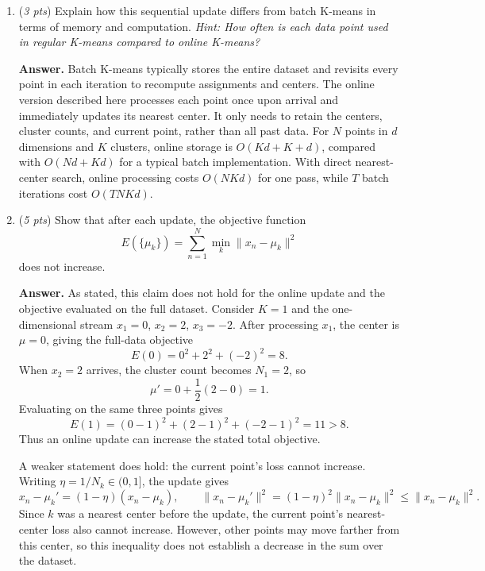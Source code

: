 \documentclass[11pt]{article}
\begin{document}
\begin{enumerate}[label=(\alph*)]
    \item (\textit{3 pts}) Explain how this sequential update differs from batch K-means in terms of memory and computation. \textit{Hint: How often is each data point used in regular K-means compared to online K-means?}

    \textbf{Answer.} Batch K-means typically stores the entire dataset and
    revisits every point in each iteration to recompute assignments and centers.
    The online version described here processes each point once upon arrival
    and immediately updates its nearest center. It only needs to retain the
    centers, cluster counts, and current point, rather than all past data.
    For $N$ points in $d$ dimensions and $K$ clusters, online storage is
    $O(Kd+K+d)$, compared with $O(Nd+Kd)$ for a typical batch implementation.
    With direct nearest-center search, online processing costs $O(NKd)$ for
    one pass, while $T$ batch iterations cost $O(TNKd)$.
    
    \item (\textit{5 pts}) Show that after each update, the objective function
    \[
    E(\{\mu_k\}) = \sum_{n=1}^N \min_k \lVert x_n - \mu_k \rVert^2
    \]
    does not increase.  

    \textbf{Answer.} As stated, this claim does not hold for the online update
    and the objective evaluated on the full dataset. Consider $K=1$ and the
    one-dimensional stream $x_1=0$, $x_2=2$, $x_3=-2$. After processing $x_1$,
    the center is $\mu=0$, giving the full-data objective
    \[
        E(0)=0^2+2^2+(-2)^2=8.
    \]
    When $x_2=2$ arrives, the cluster count becomes $N_1=2$, so
    \[
        \mu'=0+\frac12(2-0)=1.
    \]
    Evaluating on the same three points gives
    \[
        E(1)=(0-1)^2+(2-1)^2+(-2-1)^2=11>8.
    \]
    Thus an online update can increase the stated total objective.

    A weaker statement does hold: the current point's loss cannot increase.
    Writing $\eta=1/N_k\in(0,1]$, the update gives
    \[
        x_n-\mu_k'=(1-\eta)(x_n-\mu_k),
        \qquad
        \|x_n-\mu_k'\|^2=(1-\eta)^2\|x_n-\mu_k\|^2
        \leq\|x_n-\mu_k\|^2.
    \]
    Since $k$ was a nearest center before the update, the current point's
    nearest-center loss also cannot increase. However, other points may move
    farther from this center, so this inequality does not establish a decrease
    in the sum over the dataset.
\end{enumerate}    
\newpage
\end{document}
